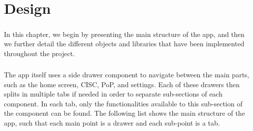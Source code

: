 \chapter{Design}
\paragraph{}
In this chapter, we begin by presenting the main structure of the app, and then we further detail the different objects and libraries that have been implemented throughout the project.

\paragraph{}
The app itself uses a side drawer component to navigate between the main parts, such as the home screen, CISC, PoP, and settings. Each of these drawers then splits in multiple tabs if needed in order to separate sub-sections of each component. In each tab, only the functionalities available to this sub-section of the component can be found. The following list shows the main structure of the app, such that each main point is a drawer and each sub-point is a tab.

